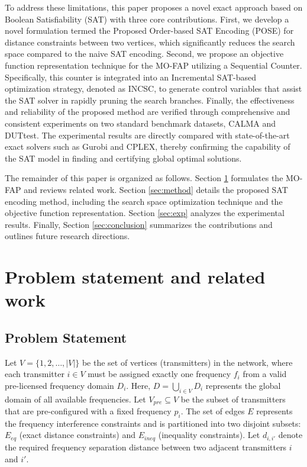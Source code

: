 \documentclass[letterpaper,journal]{IEEEtran}
\begin{document}
To address these limitations, this paper proposes a novel exact approach based on Boolean Satisfiability (SAT) with three core contributions. 
First, we develop a novel formulation termed the Proposed Order-based SAT Encoding (POSE) for distance constraints between two vertices, which significantly reduces the search space compared to the naive SAT encoding.
Second, we propose an objective function representation technique for the MO-FAP utilizing a Sequential Counter.
Specifically, this counter is integrated into an Incremental SAT-based optimization strategy, denoted as INCSC, to generate control variables that assist the SAT solver in rapidly pruning the search branches. 
Finally, the effectiveness and reliability of the proposed method are verified through comprehensive and consistent experiments on two standard benchmark datasets, CALMA and DUTtest. 
The experimental results are directly compared with state-of-the-art exact solvers such as Gurobi and CPLEX, thereby confirming the capability of the SAT model in finding and certifying global optimal solutions.

The remainder of this paper is organized as follows. Section \ref{sec:Problem_statement} formulates the MO-FAP and reviews related work. Section \ref{sec:method} details the proposed SAT encoding method, including the search space optimization technique and the objective function representation. Section \ref{sec:exp} analyzes the experimental results. Finally, Section \ref{sec:conclusion} summarizes the contributions and outlines future research directions.

\section{Problem statement and related work}
\label{sec:Problem_statement}

\subsection{Problem Statement}

Let $V=\{1, 2, \dots, |V|\}$  be the set of vertices (transmitters) in the network, where each transmitter $i \in V$ must be assigned exactly one frequency $f_i$ from a valid pre-licensed frequency domain $D_i$. Here, $D = \bigcup_{i \in V} D_i$ represents the global domain of all available frequencies. Let $V_{pre} \subseteq V$ be the subset of transmitters that are pre-configured with a fixed frequency $p_i$. The set of edges $E$ represents the frequency interference constraints and is partitioned into two disjoint subsets: $E_{eq}$ (exact distance constraints) and $E_{ineq}$ (inequality constraints). Let $d_{i,i'}$ denote the required frequency separation distance between two adjacent transmitters $i$ and $i'$.
\end{document}
